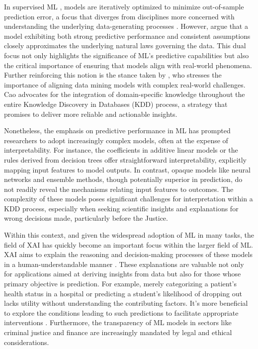 In supervised ML \cite{Vapnik1999AnTheory}, models are iteratively optimized to minimize out-of-sample prediction error, a focus that diverges from disciplines more concerned with understanding the underlying data-generating processes \cite{Mullainathan2017MachineApproach}. However, \cite{Shmueli2010ToPredict, Zhao2021CausalModels} argue that a model exhibiting both strong predictive performance and consistent assumptions closely approximates the underlying natural laws governing the data. This dual focus not only highlights the significance of ML's predictive capabilities but also the critical importance of ensuring that models align with real-world phenomena. Further reinforcing this notion is the stance taken by \cite{Cao2009IntroductionMining}, who stresses the importance of aligning data mining models with complex real-world challenges. Cao advocates for the integration of domain-specific knowledge throughout the entire Knowledge Discovery in Databases (KDD) process, a strategy that promises to deliver more reliable and actionable insights.

Nonetheless, the emphasis on predictive performance in ML has prompted researchers to adopt increasingly complex models, often at the expense of interpretability. For instance, the coefficients in additive linear models or the rules derived from decision trees offer straightforward interpretability, explicitly mapping input features to model outputs\cite{molnar2019}. In contrast, opaque models like neural networks and ensemble methods, though potentially superior in prediction, do not readily reveal the mechanisms relating input features to outcomes\cite{Linardatos2021ExplainableMethods}. The complexity of these models poses significant challenges for interpretation within a KDD process, especially when seeking scientific insights and explanations for wrong decisions made, particularly before the Justice. 

Within this context, and given the widespread adoption of ML in many tasks,  the field of XAI has quickly become an important focus within the larger field of ML. XAI aims to explain the reasoning and decision-making processes of these models in a human-understandable manner \cite{Miller2019ExplanationSciences}. These explanations are valuable not only for applications aimed at deriving insights from data but also for those whose primary objective is prediction. For example, merely categorizing a patient's health status in a hospital or predicting a student's likelihood of dropping out lacks utility without understanding the contributing factors. It's more beneficial to explore the conditions leading to such predictions to facilitate appropriate interventions \cite{Razavian2015Population-levelFactors, Pellagatti2021GeneralizedDropout, Berens2019EarlyMethods}.  Furthermore, the transparency of ML models in sectors like criminal justice \cite{Wang2023InPrediction} and finance \cite{Bussmann2021ExplainableManagement, Chen2023Globally-ConsistentEvaluation} are increasingly mandated by legal and ethical considerations. 






